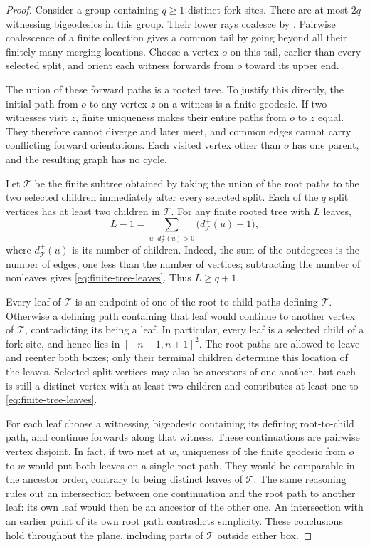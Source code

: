 \begin{proof}
Consider a group containing $q\ge1$ distinct fork sites.  There are at
most $2q$ witnessing bigeodesics in this group.  Their lower rays
coalesce by .  Pairwise coalescence of a
finite collection gives a common tail by going beyond all their finitely
many merging locations.  Choose a vertex $o$ on this tail, earlier than
every selected split, and orient each witness forwards from $o$ toward
its upper end.

The union of these forward paths is a rooted tree.  To justify this
directly, the initial path from $o$ to any vertex $z$ on a witness is a
finite geodesic.  If two witnesses visit $z$, finite uniqueness makes
their entire paths from $o$ to $z$ equal.  They therefore cannot diverge
and later meet, and common edges cannot carry conflicting forward
orientations.  Each visited vertex other than $o$ has one parent, and
the resulting graph has no cycle.

Let $\mathcal T$ be the finite subtree obtained by taking the union of
the root paths to the two selected children immediately after every
selected split.  Each of the $q$ split vertices has at least two children
in $\mathcal T$.  For any finite rooted tree with $L$ leaves,
\begin{equation}\label{eq:finite-tree-leaves}
 L-1=\sum_{u:\,d^+_{\mathcal T}(u)>0}
               \bigl(d^+_{\mathcal T}(u)-1\bigr),
\end{equation}
where $d^+_{\mathcal T}(u)$ is its number of children.  Indeed, the sum of
the outdegrees is the number of edges, one less than the number of
vertices; subtracting the number of nonleaves gives
\eqref{eq:finite-tree-leaves}.  Thus $L\ge q+1$.

Every leaf of $\mathcal T$ is an endpoint of one of the root-to-child
paths defining $\mathcal T$.  Otherwise a defining path containing that
leaf would continue to another vertex of $\mathcal T$, contradicting its
being a leaf.  In particular, every leaf is a selected child of a fork
site, and hence lies in $[-n-1,n+1]^2$.  The root paths are allowed to
leave and reenter both boxes; only their terminal children determine this
location of the leaves.  Selected split vertices may also be ancestors
of one another, but each is still a distinct vertex with at least two
children and contributes at least one to
\eqref{eq:finite-tree-leaves}.

For each leaf choose a witnessing bigeodesic containing its defining
root-to-child path, and continue forwards along that witness.  These
continuations are pairwise vertex disjoint.  In fact, if two met at $w$,
uniqueness of the finite geodesic from $o$ to $w$ would put both leaves
on a single root path.  They would be comparable in the ancestor order,
contrary to being distinct leaves of $\mathcal T$.  The same reasoning
rules out an intersection between one continuation and the root path to
another leaf: its own leaf would then be an ancestor of the other one.
An intersection with an earlier point of its own root path contradicts
simplicity.  These conclusions hold throughout the plane, including
parts of $\mathcal T$ outside either box.


\end{proof}
